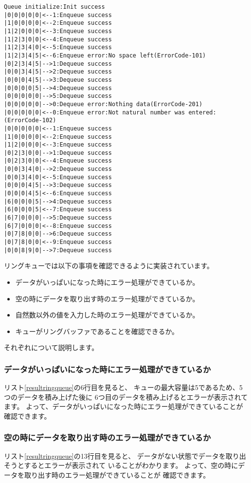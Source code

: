 \documentclass[a4j]{jarticle}
\begin{document}
\begin{lstlisting}[caption=リングキューの実行結果,label=resultringqueue]
Queue initialize:Init success
|0|0|0|0|0|<--1:Enqueue success
|1|0|0|0|0|<--2:Enqueue success
|1|2|0|0|0|<--3:Enqueue success
|1|2|3|0|0|<--4:Enqueue success
|1|2|3|4|0|<--5:Enqueue success
|1|2|3|4|5|<--6:Enqueue error:No space left(ErrorCode-101)
|0|2|3|4|5|-->1:Dequeue success
|0|0|3|4|5|-->2:Dequeue success
|0|0|0|4|5|-->3:Dequeue success
|0|0|0|0|5|-->4:Dequeue success
|0|0|0|0|0|-->5:Dequeue success
|0|0|0|0|0|-->0:Dequeue error:Nothing data(ErrorCode-201)
|0|0|0|0|0|<--0:Enqueue error:Not natural number was entered:(ErrorCode-102)
|0|0|0|0|0|<--1:Enqueue success
|1|0|0|0|0|<--2:Enqueue success
|1|2|0|0|0|<--3:Enqueue success
|0|2|3|0|0|-->1:Dequeue success
|0|2|3|0|0|<--4:Enqueue success
|0|0|3|4|0|-->2:Dequeue success
|0|0|3|4|0|<--5:Enqueue success
|0|0|0|4|5|-->3:Dequeue success
|0|0|0|4|5|<--6:Enqueue success
|6|0|0|0|5|-->4:Dequeue success
|6|0|0|0|5|<--7:Enqueue success
|6|7|0|0|0|-->5:Dequeue success
|6|7|0|0|0|<--8:Enqueue success
|0|7|8|0|0|-->6:Dequeue success
|0|7|8|0|0|<--9:Enqueue success
|0|0|8|9|0|-->7:Dequeue success
\end{lstlisting}

リングキューでは以下の事項を確認できるように実装されています。
\begin{itemize}
  \item データがいっぱいになった時にエラー処理ができているか。
  \item 空の時にデータを取り出す時のエラー処理ができているか。
  \item 自然数以外の値を入力した時のエラー処理ができているか。
  \item キューがリングバッファであることを確認できるか。
\end{itemize}

それぞれについて説明します。

\subsubsection{データがいっぱいになった時にエラー処理ができているか}
リスト\ref{resultringqueue}の6行目を見ると、
キューの最大容量は5であるため、5つのデータを積み上げた後に
6つ目のデータを積み上げるとエラーが表示されてます。
よって、データがいっぱいになった時にエラー処理ができていることが
確認できます。

\subsubsection{空の時にデータを取り出す時のエラー処理ができているか}
リスト\ref{resultringqueue}の13行目を見ると、
データがない状態でデータを取り出そうとするとエラーが表示されて
いることがわかります。
よって、空の時にデータを取り出す時のエラー処理ができていることが
確認できます。
\end{document}
